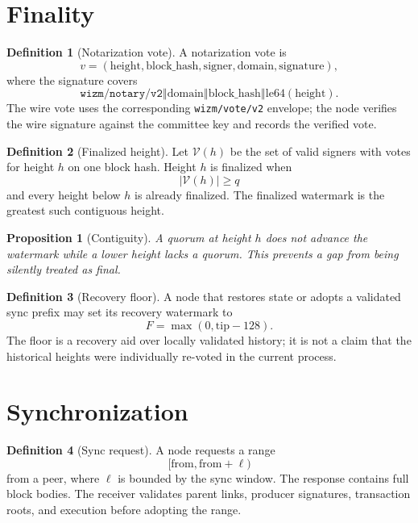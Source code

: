 \documentclass[11pt,a4paper]{article}
\theoremstyle{definition}
\newtheorem{definition}{Definition}[section]
\theoremstyle{plain}
\newtheorem{proposition}{Proposition}[section]
\newcommand{\concat}{\mathbin{\Vert}}
\begin{document}
\section{Finality}

\begin{definition}[Notarization vote]
A notarization vote is
\[
  v=(\mathrm{height},\mathrm{block\_hash},\mathrm{signer},
  \mathrm{domain},\mathrm{signature}),
\]
where the signature covers
\[
  \texttt{wizm/notary/v2}\concat\mathrm{domain}\concat
  \mathrm{block\_hash}\concat\mathrm{le64}(\mathrm{height}).
\]
The wire vote uses the corresponding \texttt{wizm/vote/v2} envelope; the node
verifies the wire signature against the committee key and records the verified
vote.
\end{definition}

\begin{definition}[Finalized height]
Let $\mathcal{V}(h)$ be the set of valid signers with votes for height $h$ on
one block hash. Height $h$ is finalized when
\[
  |\mathcal{V}(h)|\ge q
\]
and every height below $h$ is already finalized. The finalized watermark is
the greatest such contiguous height.
\end{definition}

\begin{proposition}[Contiguity]
A quorum at height $h$ does not advance the watermark while a lower height
lacks a quorum. This prevents a gap from being silently treated as final.
\end{proposition}

\begin{definition}[Recovery floor]
A node that restores state or adopts a validated sync prefix may set its
recovery watermark to
\[
  F=\max(0,\mathrm{tip}-128).
\]
The floor is a recovery aid over locally validated history; it is not a claim
that the historical heights were individually re-voted in the current
process.
\end{definition}

\section{Synchronization}

\begin{definition}[Sync request]
A node requests a range
\[
  [\mathrm{from},\mathrm{from}+\ell)
\]
from a peer, where $\ell$ is bounded by the sync window. The response contains
full block bodies. The receiver validates parent links, producer signatures,
transaction roots, and execution before adopting the range.
\end{definition}
\end{document}
